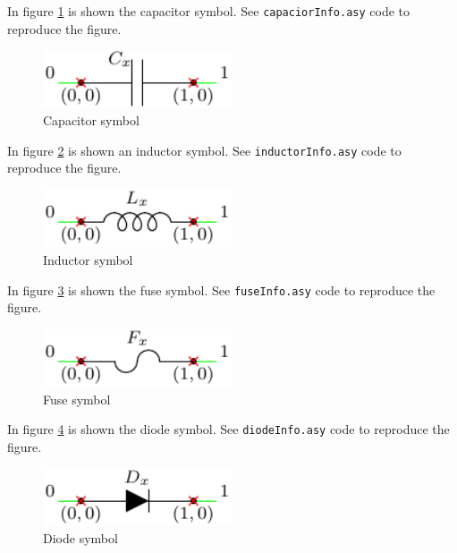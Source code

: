 \documentclass[a4paper,12pt]{report}
\begin{document}
In figure \ref{capaciorInfo} is shown the capacitor symbol. See \texttt{capaciorInfo.asy} code to reproduce the figure.

\begin{figure}[ht]
\centering
\includegraphics[width=0.5\textwidth]{capacitorInfo}
\caption{Capacitor symbol}
\label{capaciorInfo}
\end{figure}

In figure \ref{inductorInfo} is shown an inductor symbol. See \texttt{inductorInfo.asy} code to reproduce the figure.

\begin{figure}[ht]
\centering
\includegraphics[width=0.5\textwidth]{inductorInfo}
\caption{Inductor symbol}
\label{inductorInfo}
\end{figure}

In figure \ref{fuseInfo} is shown the fuse symbol. See \texttt{fuseInfo.asy} code to reproduce the figure.

\begin{figure}[ht]
\centering
\includegraphics[width=0.5\textwidth]{fuseInfo}
\caption{Fuse symbol}
\label{fuseInfo}
\end{figure}

In figure \ref{diodeInfo} is shown the diode symbol. See \texttt{diodeInfo.asy} code to reproduce the figure.

\begin{figure}[ht]
\centering
\includegraphics[width=0.5\textwidth]{diodeInfo}
\caption{Diode symbol}
\label{diodeInfo}
\end{figure}
\end{document}
